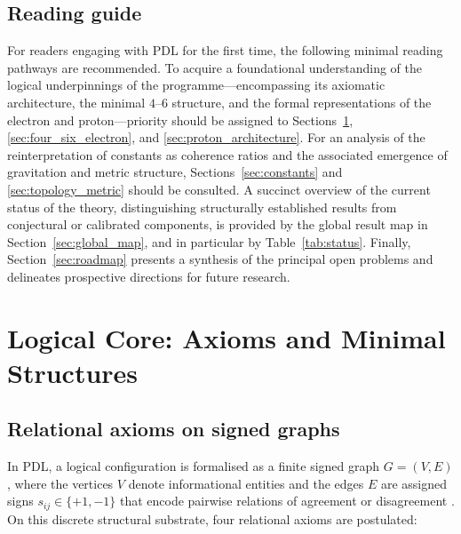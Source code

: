 \documentclass[11pt,a4paper]{article}
\begin{document}
\subsection*{Reading guide}

For readers engaging with PDL for the first time, the following minimal reading pathways are recommended. To acquire a foundational understanding of the logical underpinnings of the programme—encompassing its axiomatic architecture, the minimal $4$–$6$ structure, and the formal representations of the electron and proton—priority should be assigned to Sections~\ref{sec:logical_core}, \ref{sec:four_six_electron}, and \ref{sec:proton_architecture}. For an analysis of the reinterpretation of constants as coherence ratios and the associated emergence of gravitation and metric structure, Sections~\ref{sec:constants} and \ref{sec:topology_metric} should be consulted. A succinct overview of the current status of the theory, distinguishing structurally established results from conjectural or calibrated components, is provided by the global result map in Section~\ref{sec:global_map}, and in particular by Table~\ref{tab:status}. Finally, Section~\ref{sec:roadmap} presents a synthesis of the principal open problems and delineates prospective directions for future research.

\section{Logical Core: Axioms and Minimal Structures}
\label{sec:logical_core}

\subsection{Relational axioms on signed graphs}
\label{subsec:axioms}

In PDL, a logical configuration is formalised as a finite signed graph \(G = (V, E)\), where the vertices \(V\) denote informational entities and the edges \(E\) are assigned signs \(s_{ij} \in \{+1, -1\}\) that encode pairwise relations of agreement or disagreement \citep{PDL_Main_2026,PDL_intro}. On this discrete structural substrate, four relational axioms are postulated:
\end{document}
